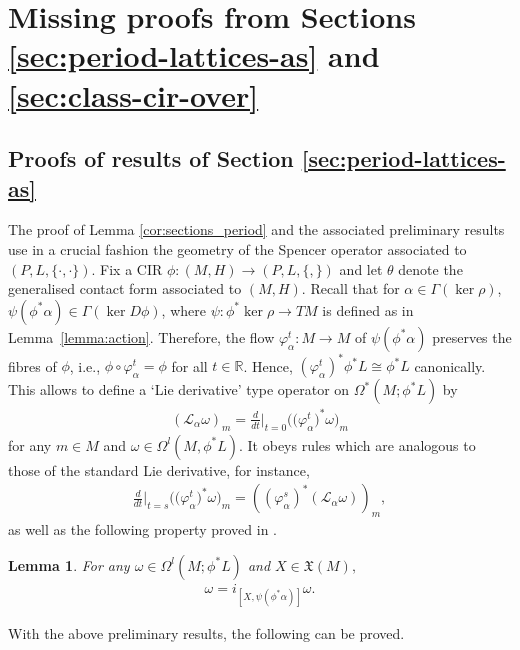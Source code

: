 \documentclass[10pt,a4paper]{amsart}
\numberwithin{equation}{section}
\newtheorem{Lemma}[Theorem]{Lemma}
\newcommand{\X}{\ensuremath{\mathfrak{X}}}
\newcommand{\JM}{(P,L,\{\cdot,\cdot\})} %
\newcommand{\CM}{(M,H)} %
\newcommand{\RR}{\mathbb{R}}
\begin{document}
\section{Missing proofs from Sections \ref{sec:period-lattices-as} and \ref{sec:class-cir-over}}\label{apendixC}

\subsection*{Proofs of results of Section \ref{sec:period-lattices-as}}
The proof of Lemma \ref{cor:sections_period} and the associated preliminary results use in a crucial fashion the geometry of the Spencer operator associated to $\JM$. Fix a CIR $\phi\colon \CM\to (P,L,\{,\})$ and let $\theta$ denote the generalised contact form associated to $\CM$. Recall that for $\alpha\in\Gamma(\ker\rho)$, $\psi( \phi^*\alpha) \in \Gamma(\ker D\phi)$, where $\psi \colon \phi^* \ker \rho \to TM$ is def\/ined as in Lemma~\ref{lemma:action}. Therefore, the f\/low $\varphi^t_{\alpha}\colon M\to M$ of $\psi(\phi^*\alpha)$ preserves the f\/ibres of $\phi$, i.e., $\phi\circ \varphi^t_{\alpha}=\phi$ for all $t \in \RR$. Hence, $(\varphi^t_{\alpha})^* \phi^* L \cong \phi^* L$ canonically. This allows to def\/ine a `Lie
derivative' type operator on $\Omega^*(M;\phi^*L)$ by
\begin{gather}\label{eq:lie_derivative}
(\mathcal{L}_{\alpha}\omega)_m=\frac{d}{dt}\Big\rvert_{t=0}\big(\big(\varphi^t_{\alpha}\big)^*\omega\big)_m\end{gather}
for any $m\in M$ and $\omega \in \Omega^l(M,\phi^*L)$. It obeys rules which are analogous to those of the standard Lie derivative, for instance,
\begin{gather} \label{eq:8}
 \frac{d}{dt}\Big\rvert_{t=s}\big(\big(\varphi^t_{\alpha}\big)^*\omega\big)_m = ((\varphi^s_{\alpha})^*(\mathcal{L}_{\alpha} \omega))_m,
\end{gather}
as well as the following property proved in \cite[Lemma 3.8]{Maria}.

\begin{Lemma}\label{lemma:imt}
 For any $\omega\in\Omega^l(M;\phi^*L)$ and $X\in\X(M),$
 \begin{gather*}
 [i_X,\mathcal{L}_{\alpha}]\omega= i_{[X,\psi(\phi^*\alpha)]}\omega.
 \end{gather*}
\end{Lemma}

With the above preliminary results, the following can be proved.
\end{document}
